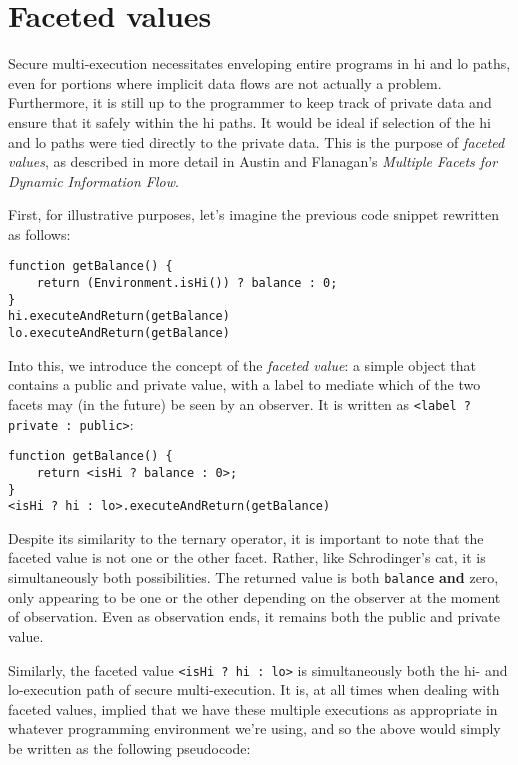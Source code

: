 \documentclass[12pt,a4paper]{article}
\begin{document}
	\section{Faceted values}
		
		Secure multi-execution necessitates enveloping entire programs in hi and lo paths, even for portions where implicit data flows are not actually a problem. Furthermore, it is still up to the programmer to keep track of private data and ensure that it safely within the hi paths. It would be ideal if selection of the hi and lo paths were tied directly to the private data. This is the purpose of \textit{faceted values}, as described in more detail in Austin and Flanagan's \textit{Multiple Facets for Dynamic Information Flow}\cite{AustinFlanagan2012}. 
		
		First, for illustrative purposes, let's imagine the previous code snippet rewritten as follows:
		
		\begin{lstlisting}
function getBalance() {
	return (Environment.isHi()) ? balance : 0;
}
hi.executeAndReturn(getBalance)
lo.executeAndReturn(getBalance)
		\end{lstlisting}
	
		Into this, we introduce the concept of the \textit{faceted value}: a simple object that contains a public and private value, with a label to mediate which of the two facets may (in the future) be seen by an observer. It is written as \lstinline{<label ? private : public>}:
		
		\begin{lstlisting}
function getBalance() {
	return <isHi ? balance : 0>;
}
<isHi ? hi : lo>.executeAndReturn(getBalance)
		\end{lstlisting}
		
		Despite its similarity to the ternary operator, it is important to note that the faceted value is not one or the other facet. Rather, like Schrodinger's cat, it is simultaneously both possibilities. The returned value is both \lstinline{balance} \textbf{and} zero, only appearing to be one or the other depending on the observer at the moment of observation. Even as observation ends, it remains both the public and private value.
		
		Similarly, the faceted value \lstinline{<isHi ? hi : lo>} is simultaneously both the hi- and lo-execution path of secure multi-execution. It is, at all times when dealing with faceted values, implied that we have these multiple executions as appropriate in whatever programming environment we're using, and so the above would simply be written as the following pseudocode:
		
\end{document}
